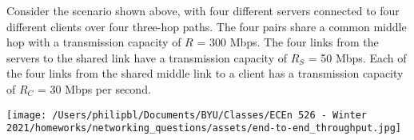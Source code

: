 \documentclass[
  addpoints, answers]{exam}
\begin{document}
\begin{questions}
\newpage


\question[3] Consider the scenario shown above, with four different servers connected to four different clients over four three-hop paths. The four pairs share a common middle hop with a transmission capacity of $R$ = 300 Mbps. The four links from the servers to the shared link have a transmission capacity of $R_S$ = 50 Mbps. Each of the four links from the shared middle link to a client has a transmission capacity of $R_C$ = 30 Mbps per second.
\begin{center}
\texttt{[image: /Users/philipbl/Documents/BYU/Classes/ECEn 526 - Winter 2021/homeworks/networking\_questions/assets/end-to-end\_throughput.jpg]}
\end{center}





\newpage



\end{questions}
\end{document}
